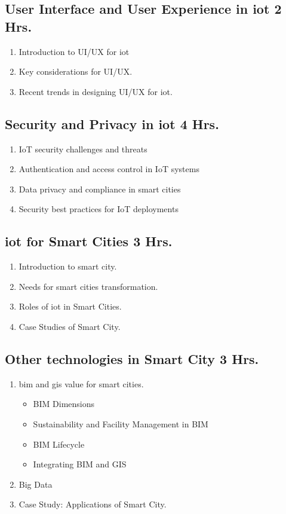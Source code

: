 \subsection{User Interface and User Experience in \acrshort{iot} \hfill{2 Hrs.}}
\begin{enumerate}
    \item Introduction to UI/UX for \acrshort{iot}
    \item Key considerations for UI/UX.
    \item Recent trends in designing UI/UX for \acrshort{iot}.
\end{enumerate}

\subsection{Security and Privacy in \acrshort*{iot} \hfill{4 Hrs.}}
\begin{enumerate}
    \item IoT security challenges and threats
    \item Authentication and access control in IoT systems
    \item Data privacy and compliance in smart cities
    \item Security best practices for IoT deployments
\end{enumerate}

\subsection{\acrshort{iot} for Smart Cities \hfill{3 Hrs.}}
\begin{enumerate}
    \item Introduction to smart city.
    \item Needs for smart cities transformation.
    \item Roles of \acrfull{iot} in Smart Cities.
    \item Case Studies of Smart City.
\end{enumerate}

\subsection{Other technologies in Smart City \hfill {3 Hrs.}}
\begin{enumerate}
    \item \acrfull{bim} and \acrfull{gis} value for smart cities.
    \begin{itemize}
        \item BIM Dimensions
        \item Sustainability and Facility Management in BIM
        \item BIM Lifecycle
        \item Integrating BIM and GIS
    \end{itemize}
    \item Big Data
    \item Case Study: Applications of Smart City.
\end{enumerate}

